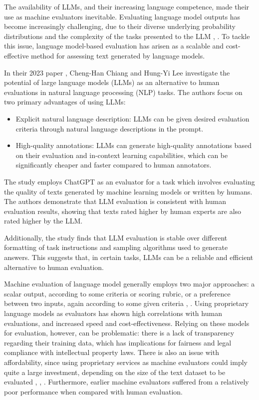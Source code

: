 \documentclass{article}
\begin{document}
The availability of LLMs, and their increasing language competence, made their use as machine evaluators inevitable. Evaluating language model outputs has become increasingly challenging, due to their diverse underlying probability distributions and the complexity of the tasks presented to the LLM \citet{li2024leveraginglargelanguagemodels}, \citet{gao2024llmbasednlgevaluationcurrent}. To tackle this issue, language model-based evaluation has arisen as a scalable and cost-effective method for assessing text generated by language models. 

In their 2023 paper \citet{chiang-lee-2023-large}, Cheng-Han Chiang and Hung-Yi Lee investigate the potential of large language models (LLMs) as an alternative to human evaluations in natural language processing (NLP) tasks. The authors focus on two primary advantages of using LLMs:

\begin{itemize}
    \item{Explicit natural language description:} LLMs can be given desired evaluation criteria through natural language descriptions in the prompt.
    \item{High-quality annotations:} LLMs can generate high-quality annotations based on their evaluation and in-context learning capabilities, which can be significantly cheaper and faster compared to human annotators.
\end{itemize}
The study employs ChatGPT as an evaluator for a task which involves evaluating the quality of texts generated by machine learning models or written by humans. The authors demonstrate that LLM evaluation is consistent with human evaluation results, showing that texts rated higher by human experts are also rated higher by the LLM.

Additionally, the study finds that LLM evaluation is stable over different formatting of task instructions and sampling algorithms used to generate answers. This suggests that, in certain tasks, LLMs can be a reliable and efficient alternative to human evaluation.


Machine evaluation of language model generally employs two major approaches: a scalar output, according to some criteria or scoring rubric, or a preference between two inputs, again according to some given criteria \citet{zheng2023judgingllmasajudgemtbenchchatbot}, \citet{li2024leveraginglargelanguagemodels}. Using proprietary language models as evaluators has shown high correlations with human evaluations, and increased speed and cost-effectiveness. Relying on these models for evaluation, however, can be problematic: there is a lack of transparency regarding their training data, which has implications for fairness and legal compliance with intellectual property laws. There is also an issue with affordability, since using proprietary services as machine evaluators could imply quite a large investment, depending on the size of the text dataset to be evaluated \citet{wang2024pandalmautomaticevaluationbenchmark}, \citet{dubois2023alpacafarm}, \citet{kim2024prometheusinducingfinegrainedevaluation}. Furthermore, earlier machine evaluators suffered from a relatively poor performance when compared with human evaluation. 
\end{document}
